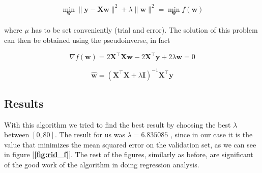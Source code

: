 \documentclass[12pt]{report}
\begin{document}
\begin{equation}
\operatorname { min } _ { \mathbf { w } } \| \mathbf { y } - \mathbf { X } \mathbf { w } \| ^ { 2 } + \lambda \| \mathbf { w } \| ^ { 2 } = \operatorname { min } _ { \mathbf { w } } f ( \mathbf { w } )
\end{equation}\\
where $\mu$ has to be set conveniently (trial and error). The solution of this problem can then be obtained using the pseudoinverse, in fact

\begin{equation}
\nabla f ( \mathbf { w } ) = 2 \mathbf { X } ^ { \top } \mathbf { X } \mathbf { w } - 2 \mathbf { X } ^ { \top } \mathbf { y } + 2 \lambda \mathbf { w } = 0
\end{equation}


\begin{equation}
\hat { \mathbf { w } } = \left( \mathbf { X } ^ { \top } \mathbf { X } + \lambda \mathbf { I } \right) ^ { - 1 } \mathbf { X } ^ { \top } \mathbf { y }
\end{equation}


\subsection{Results}
With this algorithm we tried to find the best result by choosing the best $\lambda$ between $[0,80]$. The result for us was $\lambda =6.835085$ , since in our case it is the value that minimizes the mean squared error on the validation set, as we can see in figure [\textbf{\ref{fig:rid_f}}]. The rest of the figures, similarly as before, are significant of the good work of the algorithm in doing regression analysis.


\pagebreak
\end{document}
